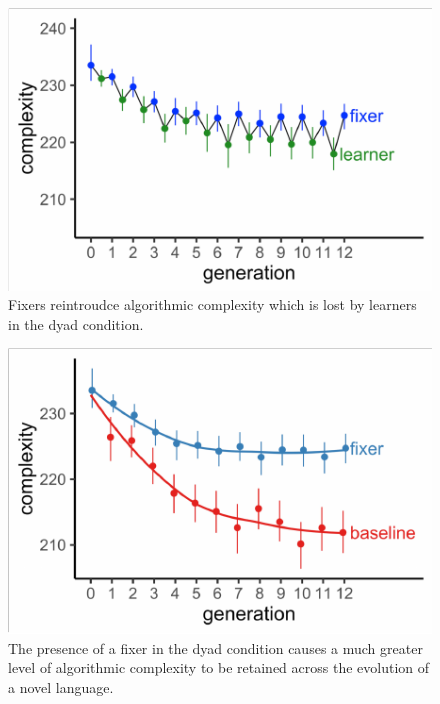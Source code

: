 \documentclass[10pt, letterpaper]{article}
\newenvironment{CodeChunk}{}{}
\begin{document}
\begin{CodeChunk}
\begin{figure}[tb]

{\centering \includegraphics{figs/dyad_complexity-1} 

}

\caption[Fixers reintroudce algorithmic complexity which is lost by learners in the dyad condition]{Fixers reintroudce algorithmic complexity which is lost by learners in the dyad condition.}\label{fig:dyad_complexity}
\end{figure}
\end{CodeChunk}

\begin{CodeChunk}
\begin{figure}[tb]

{\centering \includegraphics{figs/both_complexity-1} 

}

\caption[The presence of a fixer in the dyad condition causes a much greater level of algorithmic complexity to be retained across the evolution of a novel language]{The presence of a fixer in the dyad condition causes a much greater level of algorithmic complexity to be retained across the evolution of a novel language.}\label{fig:both_complexity}
\end{figure}
\end{CodeChunk}
\end{document}
